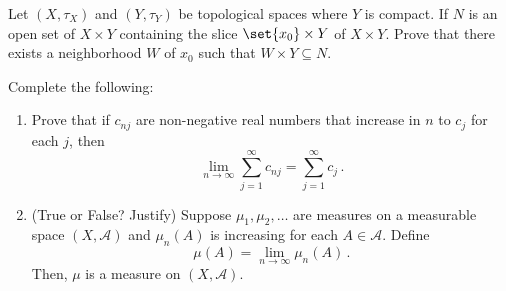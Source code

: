 \documentclass[12pt]{amsart}
\begin{document}
\begin{question}[20 points]
	Let $(X, \tau_X)$ and $(Y, \tau_Y)$ be topological spaces where $Y$ is compact.
	If $N$ is an open set of $X\times Y$ containing the slice $\set{x_0} \times Y$ of $X \times Y$.
	Prove that there exists a neighborhood $W$ of $x_0$ such that $W\times Y \subseteq N$.
\end{question}

\begin{question}[20 points] Complete the following:
	\begin{enumerate}
		\item Prove that if $c_{nj}$ are non-negative real numbers that increase in $n$ to $c_j$ for each $j$,
		      then
		      \begin{equation*}
			      \lim_{n\to \infty} \sum_{j=1}^\infty c_{nj} = \sum_{j=1}^\infty c_j \,.
		      \end{equation*}

		\item (True or False? Justify)
		      Suppose $\mu_1, \mu_2, \dots$ are measures on a measurable space $(X, \mathcal{A})$
		      and $\mu_n (A)$ is increasing for each $A \in \mathcal{A}$.
		      Define
		      \begin{equation*}
			      \mu(A) = \lim_{n\to \infty} \mu_n(A) \,.
		      \end{equation*}
		      Then, $\mu$ is a measure on $(X, \mathcal{A})$.
	\end{enumerate}
\end{question}
\end{document}
